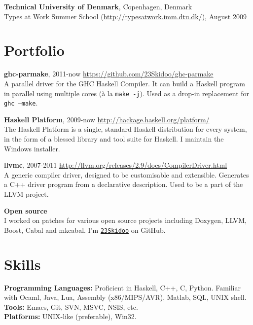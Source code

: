 \documentclass[margin,line]{res}
\begin{document}
\begin{resume}
{\bf Technical University of Denmark}, Copenhagen, Denmark\\
Types at Work Summer School (\url{http://typesatwork.imm.dtu.dk/}), August 2009

\section{\sc Portfolio}

{\bf ghc-parmake}, 2011-now \hfill \url{https://github.com/23Skidoo/ghc-parmake}\\
A parallel driver for the GHC Haskell Compiler. It can build a Haskell
program in parallel using multiple cores (à la \texttt{make -j}). Used as a
drop-in replacement for \texttt{ghc --make}.

{\bf Haskell Platform}, 2009-now \hfill \url{http://hackage.haskell.org/platform/}\\
The Haskell Platform is a single, standard Haskell distribution for every
system, in the form of a blessed library and tool suite for Haskell. I maintain
the Windows installer.

{\bf llvmc}, 2007-2011 \hfill \url{http://llvm.org/releases/2.9/docs/CompilerDriver.html}\\
A generic compiler driver, designed to be customisable and extensible. Generates
a C++ driver program from a declarative description. Used to be a part of the
LLVM project.


{\bf Open source}\\ I worked on patches for various open source projects
including Doxygen, LLVM, Boost, Cabal and mkcabal. I'm
\href{https://github.com/23Skidoo/}{\texttt{23Skidoo}} on GitHub.


\section{\sc Skills}

{\bf Programming Languages:} Proficient in Haskell, C++, C, Python. Familiar
with Ocaml, Java, Lua, Assembly (x86/MIPS/AVR), Matlab, SQL, UNIX shell. \\
{\bf Tools:} Emacs, Git, SVN, MSVC, NSIS, etc.\\
{\bf Platforms:} UNIX-like (preferable), Win32.


\end{resume}
\end{document}
